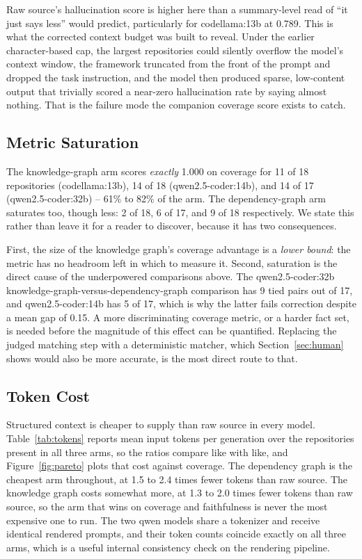 \documentclass[conference]{IEEEtran}
\begin{document}
Raw source's hallucination score is higher here than a summary-level read of ``it just says
less'' would predict, particularly for codellama:13b at 0.789. This is what the corrected
context budget was built to reveal. Under the earlier character-based cap, the largest
repositories could silently overflow the model's context window, the framework truncated from
the front of the prompt and dropped the task instruction, and the model then produced sparse,
low-content output that trivially scored a near-zero hallucination rate by saying almost
nothing. That is the failure mode the companion coverage score exists to catch.

\subsection{Metric Saturation}
\label{sec:ceiling}
The knowledge-graph arm scores \emph{exactly} 1.000 on coverage for 11 of 18 repositories
(codellama:13b), 14 of 18 (qwen2.5-coder:14b), and 14 of 17 (qwen2.5-coder:32b) -- 61\% to 82\%
of the arm. The dependency-graph arm saturates too, though less: 2 of 18, 6 of 17, and 9 of 18
respectively. We state this rather than leave it for a reader to discover, because it has two
consequences.

First, the size of the knowledge graph's coverage advantage is a \emph{lower bound}: the metric
has no headroom left in which to measure it. Second, saturation is the direct cause of the
underpowered comparisons above. The qwen2.5-coder:32b knowledge-graph-versus-dependency-graph
comparison has 9 tied pairs out of 17, and qwen2.5-coder:14b has 5 of 17, which is why the
latter fails correction despite a mean gap of 0.15. A more discriminating coverage metric, or a
harder fact set, is needed before the magnitude of this effect can be quantified. Replacing the
judged matching step with a deterministic matcher, which Section~\ref{sec:human} shows would
also be more accurate, is the most direct route to that.

\subsection{Token Cost}
Structured context is cheaper to supply than raw source in every model.
Table~\ref{tab:tokens} reports mean input tokens per generation over the repositories present in
all three arms, so the ratios compare like with like, and Figure~\ref{fig:pareto} plots that
cost against coverage. The dependency graph is the cheapest arm throughout, at 1.5 to 2.4 times
fewer tokens than raw source. The knowledge graph costs somewhat more, at 1.3 to 2.0 times fewer
tokens than raw source, so the arm that wins on coverage and faithfulness is never the most
expensive one to run. The two qwen models share a tokenizer and receive identical rendered
prompts, and their token counts coincide exactly on all three arms, which is a useful internal
consistency check on the rendering pipeline.
\end{document}
